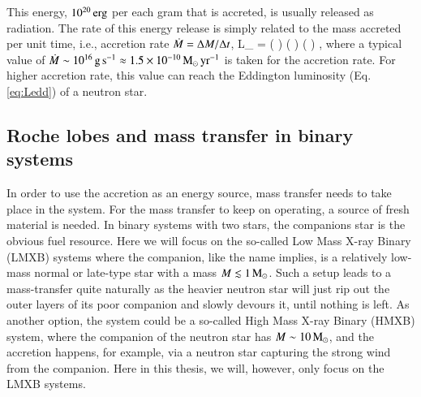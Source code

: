 This energy, $10^{20} \, \mathrm{erg}$ per each gram that is accreted, is usually released as radiation.
The rate of this energy release is simply related to the mass accreted per unit time, i.e., accretion rate $\dot{M} = \Delta M/ \Delta t$, 
\be
L_{} = \Mdot {} \approx {} \left(  \right) \left(  \right) \left(  \right) \ergs,
\ee
where a typical value of $\dot{M} \sim 10^{16} \, \mathrm{g}\,\mathrm{s}^{-1} \approx 1.5 \times 10^{-10} \, \mathrm{M}_{\odot}\,\mathrm{yr}^{-1}$ is taken for the accretion rate.
For higher accretion rate, this value can reach the Eddington luminosity (Eq. \eqref{eq:Ledd}) of a neutron star.



\subsection{Roche lobes and mass transfer in binary systems}

In order to use the accretion as an energy source, mass transfer needs to take place in the system.
For the mass transfer to keep on operating, a source of fresh material is needed.
In binary systems with two stars, the companions star is the obvious fuel resource.
Here we will focus on the so-called Low Mass X-ray Binary (LMXB) systems where the companion, like the name implies, is a relatively low-mass normal or late-type star with a mass $M \lesssim 1 \, \mathrm{M}_{\odot}$.\cite{TH06}
Such a setup leads to a mass-transfer quite naturally as the heavier neutron star will just rip out the outer layers of its poor companion and slowly devours it, until nothing is left.
As another option, the system could be a so-called High Mass X-ray Binary (HMXB) system, where the companion of the neutron star has $M \sim 10\, \mathrm{M}_{\odot}$, and the accretion happens, for example, via a neutron star capturing the strong wind from the companion.
Here in this thesis, we will, however, only focus on the LMXB systems.


